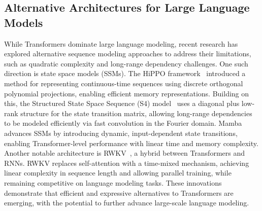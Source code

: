 \subsection{Alternative Architectures for Large Language Models}
While Transformers dominate large language modeling, recent research has explored alternative sequence modeling approaches to address their limitations, such as quadratic complexity and long-range dependency challenges. One such direction is state space models (SSMs). The HiPPO framework~\citep{gu2020hippo} introduced a method for representing continuous-time sequences using discrete orthogonal polynomial projections, enabling efficient memory representations. Building on this, the Structured State Space Sequence (S4) model~\citep{gu2021efficiently} uses a diagonal plus low-rank structure for the state transition matrix, allowing long-range dependencies to be modeled efficiently via fast convolution in the Fourier domain.
Mamba~\citep{gu2023mamba} advances SSMs by introducing dynamic, input-dependent state transitions, enabling Transformer-level performance with linear time and memory complexity. Another notable architecture is RWKV~\citep{peng2023rwkv}, a hybrid between Transformers and RNNs. RWKV replaces self-attention with a time-mixed mechanism, achieving linear complexity in sequence length and allowing parallel training, while remaining competitive on language modeling tasks.
These innovations demonstrate that efficient and expressive alternatives to Transformers are emerging, with the potential to further advance large-scale language modeling.

